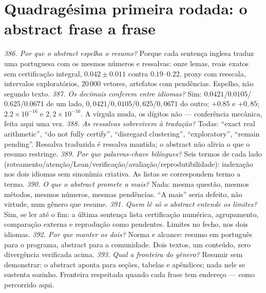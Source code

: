 \section{Quadragésima primeira rodada: o abstract frase a frase}
\textit{386. Por que o abstract espelha o resumo?} Porque cada sentença inglesa traduz uma portuguesa com os mesmos números e ressalvas: onze lemas, reais exatos sem certificação integral, $0.042\pm0.011$ contra $0.19$--$0.22$, proxy com reescala, intervalos exploratórios, 20\,000 vetores, artefatos com pendências. Espelho, não segundo texto.
\textit{387. Os decimais conferem entre idiomas?} Sim: $0.0421$/$0.0105$/$0.625$/$0.0671$ de um lado, $0{,}0421$/$0{,}0105$/$0{,}625$/$0{,}0671$ do outro; $+0.85$ e $+0{,}85$; $2.2\times10^{-16}$ e $2{,}2\times10^{-16}$. A vírgula muda, os dígitos não --- conferência mecânica, feita aqui uma vez.
\textit{388. As ressalvas sobrevivem à tradução?} Todas: ``exact real arithmetic'', ``do not fully certify'', ``disregard clustering'', ``exploratory'', ``remain pending''. Ressalva traduzida é ressalva mantida; o abstract não alivia o que o resumo restringe.
\textit{389. Por que palavras-chave bilíngues?} Seis termos de cada lado (roteamento/atenção/Lean/verificação/avaliação/reprodutibilidade): indexação nos dois idiomas sem sinonímia criativa. As listas se correspondem termo a termo.
\textit{390. O que o abstract promete a mais?} Nada: mesma questão, mesmos métodos, mesmos números, mesmas pendências. ``A mais'' seria defeito, não virtude, num gênero que resume.
\textit{391. Quem lê só o abstract entende os limites?} Sim, se ler até o fim: a última sentença lista certificação numérica, agrupamento, comparação externa e reprodução como pendentes. Limites no fecho, nos dois idiomas.
\textit{392. Por que manter os dois?} Norma e alcance: resumo em português para o programa, abstract para a comunidade. Dois textos, um conteúdo, zero divergência verificada acima.
\textit{393. Qual a fronteira do gênero?} Resumir sem demonstrar: o abstract aponta para seções, tabelas e apêndices; nada nele se sustenta sozinho. Fronteira respeitada quando cada frase tem endereço --- como percorrido aqui.
